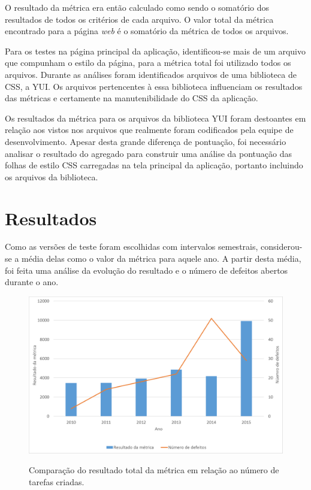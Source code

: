 O resultado da métrica era então calculado como sendo o somatório dos resultados de todos os critérios de cada arquivo. O valor total da métrica encontrado para a página \textit{web} é o somatório da métrica de todos os arquivos.

Para os testes na página principal da aplicação, identificou-se mais de um arquivo que compunham o estilo da página, para a métrica total foi utilizado todos os arquivos. Durante as análises foram identificados arquivos de uma biblioteca de CSS, a YUI\footnotemark. Os arquivos pertencentes à essa biblioteca influenciam os resultados das métricas e certamente na manutenibilidade do CSS da aplicação.


Os resultados da métrica para os arquivos da biblioteca YUI foram destoantes em relação aos vistos nos arquivos que realmente foram codificados pela equipe de desenvolvimento. Apesar desta grande diferença de pontuação, foi necessário  analisar o resultado do agregado para construir uma análise da pontuação das folhas de estilo CSS carregadas na tela principal da aplicação, portanto incluindo os arquivos da biblioteca.

\section{Resultados}

Como as versões de teste foram escolhidas com intervalos semestrais, considerou-se a média delas como o valor da métrica para aquele ano. A partir desta média, foi feita uma análise da evolução do resultado e o número de defeitos abertos durante o ano.

\begin{figure}[!htbp]
	\centering
	\caption{Comparação do resultado total da métrica em relação ao número de tarefas criadas.}
	\includegraphics[width=1\textwidth]{./04-figuras/total_issues}
	\label{fig:totalXIssue}
\end{figure}

